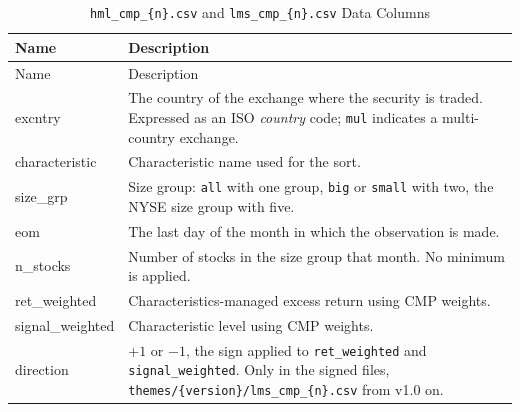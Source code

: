 \documentclass[12pt,title,fleqn]{article}
\begin{document}
{\scriptsize
	\begin{longtable}{@{\extracolsep{\fill}}|l|m{14.2cm}|@{}}
	\caption{\texttt{hml\_cmp\_\{n\}.csv} and \texttt{lms\_cmp\_\{n\}.csv} Data Columns \label{cmp}}\\
	
	\hline
	Name & Description \\
	\hline
	\endfirsthead
	
	\hline
	Name & Description \\
	\hline
	\endhead
	
	\hline
	\endfoot
	
	
	\hline\hline
	\endlastfoot
	
	excntry\rule{0pt}{10pt} & The country of the exchange where the security is traded. Expressed as an ISO \emph{country} code; \texttt{mul} indicates a multi-country exchange. \\[1ex]
	
	characteristic & Characteristic name used for the sort. \\[1ex]

	size\_grp & Size group: \texttt{all} with one group, \texttt{big} or \texttt{small} with two, the NYSE size group with five.\\[1ex]
    
    eom & The last day of the month in which the observation is made. \\[1ex]

    n\_stocks & Number of stocks in the size group that month. No minimum is applied. \\[1ex]

    ret\_weighted & Characteristics-managed excess return using CMP weights. \\[1ex]

    signal\_weighted & Characteristic level using CMP weights. \\[1ex]

    direction & $+1$ or $-1$, the sign applied to \texttt{ret\_weighted} and \texttt{signal\_weighted}. Only in the signed files, \texttt{themes/\{version\}/lms\_cmp\_\{n\}.csv} from v1.0 on. \\[1ex]

\end{longtable}}
\end{document}
